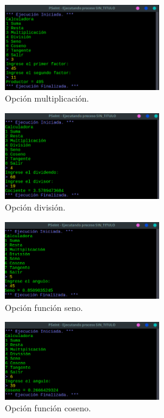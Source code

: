 \documentclass[11pt, a4paper]{report}
\begin{document}
\begin{figure}[!ht]
\begin{center}
  \includegraphics[width=0.6\textwidth]{respuesta16.png}
  \caption{Opci\'on multiplicaci\'on.}
\end{center}
\end{figure} 

\begin{figure}[!ht]
\begin{center}
  \includegraphics[width=0.6\textwidth]{respuesta17.png}
  \caption{Opci\'on divisi\'on.}
\end{center}
\end{figure} 

\begin{figure}[!ht]
\begin{center}
  \includegraphics[width=0.6\textwidth]{respuesta18.png}
  \caption{Opci\'on funci\'on seno.}
\end{center}
\end{figure} 

\begin{figure}[!ht]
\begin{center}
  \includegraphics[width=0.6\textwidth]{respuesta19.png}
  \caption{Opci\'on funci\'on coseno.}
\end{center}
\end{figure}
\end{document}
